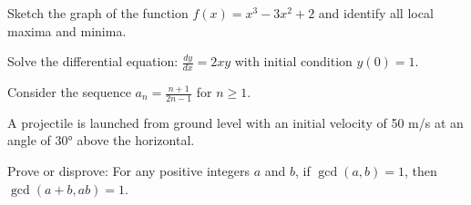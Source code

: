 \documentclass[12pt]{exam}
\begin{document}
\begin{questions}
\question Sketch the graph of the function $f(x) = x^3 - 3x^2 + 2$ and identify all local maxima and minima.

\question Solve the differential equation: $\frac{dy}{dx} = 2xy$ with initial condition $y(0) = 1$.

\question Consider the sequence $a_n = \frac{n+1}{2n-1}$ for $n \geq 1$.

\question A projectile is launched from ground level with an initial velocity of 50 m/s at an angle of 30° above the horizontal.

\question Prove or disprove: For any positive integers $a$ and $b$, if $\gcd(a,b) = 1$, then $\gcd(a+b, ab) = 1$.

\end{questions}
\end{document}
